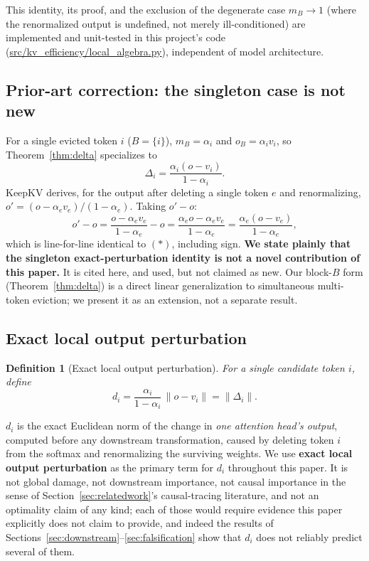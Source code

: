 \documentclass[11pt]{article}
\newtheorem{definition}{Definition}
\begin{document}
This identity, its proof, and the exclusion of the degenerate case
$m_B \to 1$ (where the renormalized output is undefined, not merely
ill-conditioned) are implemented and unit-tested in this project's code
(\url{src/kv_efficiency/local_algebra.py}), independent of model
architecture.

\subsection{Prior-art correction: the singleton case is not new}
\label{sec:priorart}

For a single evicted token $i$ ($B=\{i\}$), $m_B = \alpha_i$ and
$o_B = \alpha_i v_i$, so Theorem~\ref{thm:delta} specializes to
\[
\Delta_i = \frac{\alpha_i(o - v_i)}{1-\alpha_i}. \tag{$\ast$}
\]
KeepKV \cite{keepkv2025} derives, for the output after deleting a single
token $e$ and renormalizing, $o' = (o - \alpha_e v_e)/(1-\alpha_e)$. Taking
$o' - o$:
\[
o'-o = \frac{o-\alpha_e v_e}{1-\alpha_e} - o
= \frac{\alpha_e o - \alpha_e v_e}{1-\alpha_e}
= \frac{\alpha_e(o-v_e)}{1-\alpha_e},
\]
which is line-for-line identical to $(\ast)$, including sign. \textbf{We
state plainly that the singleton exact-perturbation identity is not a novel
contribution of this paper.} It is cited here, and used, but not claimed as
new. Our block-$B$ form (Theorem~\ref{thm:delta}) is a direct linear
generalization to simultaneous multi-token eviction; we present it as an
extension, not a separate result.

\subsection{Exact local output perturbation}

\begin{definition}[Exact local output perturbation]
For a single candidate token $i$, define
\[
d_i = \frac{\alpha_i}{1-\alpha_i}\,\|o - v_i\| = \|\Delta_i\| .
\]
\end{definition}

$d_i$ is the exact Euclidean norm of the change in \emph{one attention
head's output}, computed before any downstream transformation, caused by
deleting token $i$ from the softmax and renormalizing the surviving weights.
We use \textbf{exact local output perturbation} as the primary term for
$d_i$ throughout this paper. It is not global damage, not downstream
importance, not causal importance in the sense of Section~\ref{sec:relatedwork}'s
causal-tracing literature, and not an optimality claim of any kind; each of
those would require evidence this paper explicitly does not claim to
provide, and indeed the results of Sections~\ref{sec:downstream}--\ref{sec:falsification}
show that $d_i$ does not reliably predict several of them.
\end{document}
